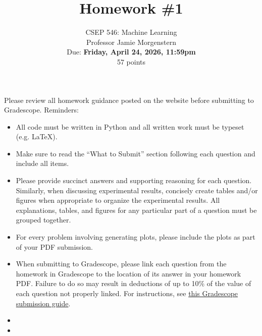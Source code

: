 \documentclass{article}
\begin{document}
\setcounter{aprob}{0}
\title{Homework \#1}
\author{
    \normalsize{CSEP 546: Machine Learning}\\
    \normalsize{Professor Jamie Morgenstern}\\
    \normalsize{Due: \textbf{Friday, April 24, 2026, 11:59pm}}\\
    \normalsize{57 points}
}
\date{{}}
\maketitle

\noindent Please review all homework guidance posted on the website before submitting to Gradescope. Reminders:
\begin{itemize}
    \item All code must be written in Python and all written work must be typeset (e.g. \LaTeX{}).
    \item Make sure to read the ``What to Submit'' section following each question and include all items.
    \item Please provide succinct answers and supporting reasoning for each question. Similarly, when discussing experimental results, concisely create tables and/or figures when appropriate to organize the experimental results. All explanations, tables, and figures for any particular part of a question must be grouped together.
    \item For every problem involving generating plots, please include the plots as part of your PDF submission.
    \item When submitting to Gradescope, please link each question from the homework in Gradescope to the location of its answer in your homework PDF. Failure to do so may result in deductions of up to 10\% of the value of each question not properly linked. For instructions, see \href{https://www.gradescope.com/get_started#student-submission}{this Gradescope submission guide}.
    \item {}
    \item {}
\end{itemize}
\end{document}
